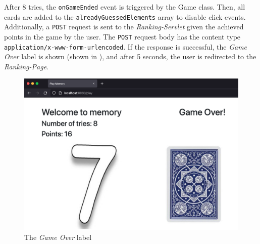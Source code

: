\newpage
After 8 tries, the \texttt{onGameEnded} event is triggered by the Game class. Then, all cards are added to the \texttt{alreadyGuessedElements} array to disable click events. Additionally, a \texttt{POST} request is sent to the \textit{Ranking-Servlet} given the achieved points in the game by the user. The \texttt{POST} request body has the content type \texttt{application/x-www-form-urlencoded}. If the response is successful, the \textit{Game Over} label is shown (shown in ), and after 5 seconds, the user is redirected to the \textit{Ranking-Page}.
\begin{figure}[h]
\centering
\includegraphics[scale=0.2]{images/03_impl/frontend/game-over}
\caption{The \textit{Game Over} label}
\label{fig:03_impl_frontend_memGame_gameOver}
\end{figure}
